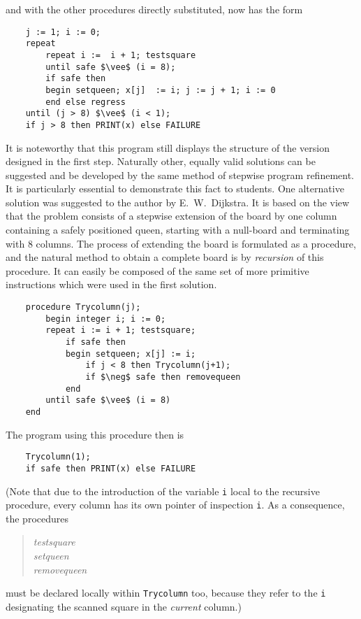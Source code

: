 and with the other procedures directly substituted, now has the form

\begin{lstlisting}
    j := 1; i := 0;
    repeat
        repeat i :=  i + 1; testsquare
        until safe $\vee$ (i = 8);
        if safe then
        begin setqueen; x[j]  := i; j := j + 1; i := 0
        end else regress
    until (j > 8) $\vee$ (i < 1);
    if j > 8 then PRINT(x) else FAILURE
\end{lstlisting}

It is noteworthy that this program still displays the structure of the version
designed in the first step. Naturally other, equally valid solutions can be
suggested and be developed by the same method of stepwise program refinement.
It is particularly essential to demonstrate this fact to students.  One
alternative solution was suggested to the author by E.~W.~Dijkstra.  It is
based on the view that the problem consists of a stepwise extension of the
board by one column containing a safely positioned queen, starting with a
null-board and terminating with 8 columns. The process of extending the board
is formulated as a procedure, and the natural method to obtain a complete board
is by \emph{recursion} of this procedure. It can easily be composed of the same
set of more primitive instructions which were used in the first solution.

\begin{lstlisting}
    procedure Trycolumn(j);
        begin integer i; i := 0;
        repeat i := i + 1; testsquare;
            if safe then
            begin setqueen; x[j] := i; 
                if j < 8 then Trycolumn(j+1); 
                if $\neg$ safe then removequeen 
            end 
        until safe $\vee$ (i = 8)
    end
\end{lstlisting}

The program using this procedure then is

\begin{lstlisting}
    Trycolumn(1); 
    if safe then PRINT(x) else FAILURE
\end{lstlisting}

(Note that due to the introduction of the variable \verb|i| local to the
recursive procedure, every column has its own pointer of inspection \verb|i|.
As a consequence, the procedures

\begin{quote}
\emph{testsquare}\\
\emph{setqueen}\\
\emph{removequeen }\\
\end{quote}

must be declared locally within \verb|Trycolumn| too, because they refer to the
\verb|i| designating the scanned square in the \emph{current} column.)
